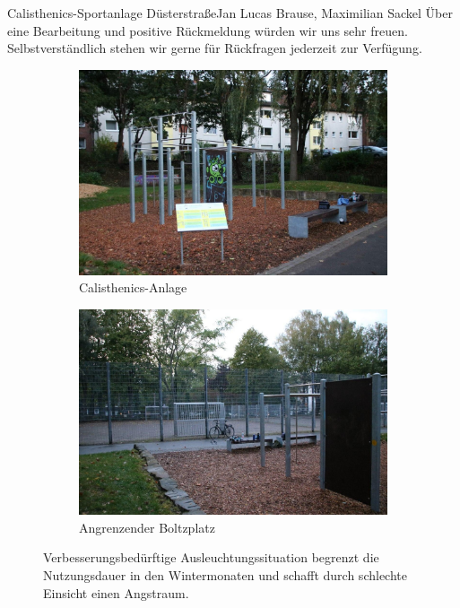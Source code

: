 \documentclass{../../templates/amendment}
\begin{document}
\begin{boxed}{Calisthenics-Sportanlage Düsterstraße}{Jan Lucas Brause, Maximilian Sackel}
    Über eine Bearbeitung und positive Rückmeldung würden wir uns sehr freuen.
    Selbstverständlich stehen wir gerne für Rückfragen jederzeit zur Verfügung.

    \begin{figure}[htpb]
        \centering
        \begin{subfigure}[]{0.49\textwidth}
            \begin{center}
                \includegraphics[width=\linewidth]{pictures/photo1.jpg}
                \caption{Calisthenics-Anlage}%
            \end{center}
        \end{subfigure}
        \begin{subfigure}[]{0.49\textwidth}
            \begin{center}
                \includegraphics[width=\linewidth]{pictures/photo3.jpg}
                \caption{Angrenzender Boltzplatz}%
            \end{center}
        \end{subfigure}
        \caption{Verbesserungsbedürftige Ausleuchtungssituation begrenzt die
            Nutzungsdauer in den Wintermonaten und schafft durch schlechte Einsicht
            einen Angstraum.}
    \end{figure}


\end{boxed}
\end{document}
